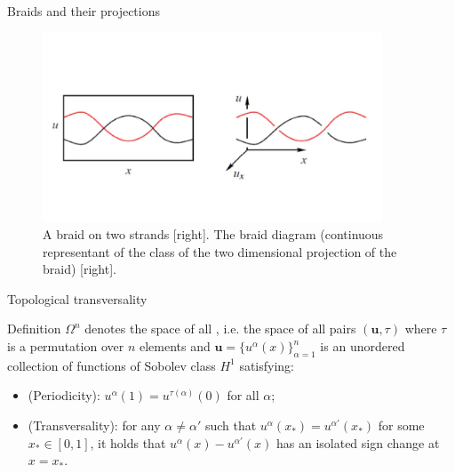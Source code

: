 \documentclass[9pt, english]{beamer}
\theoremstyle{definition}
\newcommand{\simbolovettore}[1]{{\boldsymbol{#1}}}
\newcommand{\vu}{\simbolovettore{u}}
\begin{document}
\begin{frame}{Braids and their projections}
\begin{figure}\label{fig:braiddiagram}
        \includegraphics[width=0.9\textwidth]{images/Fig16Wojcik21.pdf}\caption{A braid on two strands [right]. The braid diagram (continuous
         representant of the class of the two dimensional projection of the braid) [right].}
        \end{figure}
\end{frame}
\begin{frame}{Topological transversality}
        \begin{block}{Definition}
            $\Omega^n$ denotes the space of all
            , i.e. the space of all pairs $(\vu, \tau)$ where $\tau$ is a permutation
            over $n$ elements and $\vu=\{u^\alpha(x)\}_{\alpha=1}^n$ is an unordered collection of functions of
            Sobolev class $H^1$ satisfying:
            \begin{itemize}
            \item (Periodicity): $u^\alpha(1)= u^{\tau(\alpha)}(0)$ for
            all $\alpha$;\pause
            \item (Transversality): for any $\alpha \neq \alpha'$ such
            that $u^\alpha(x_*) = u^{\alpha'}(x_*)$ for some $x_* \in
            [0,1]$, it holds that $u^\alpha(x)- u^{\alpha'}(x)$ has an
            isolated sign change at $x=x_*$.
            \end{itemize}
         \end{block}
\end{frame}
\end{document}
